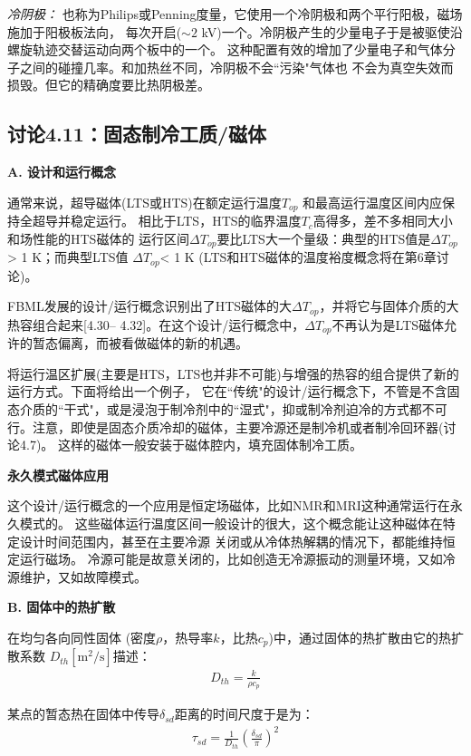 \textit{冷阴极：} 也称为Philips或Penning度量，它使用一个冷阴极和两个平行阳极，磁场施加于阳极板法向，
每次开启($\sim 2$ kV)一个。冷阴极产生的少量电子于是被驱使沿螺旋轨迹交替运动向两个板中的一个。
这种配置有效的增加了少量电子和气体分子之间的碰撞几率。和加热丝不同，冷阴极不会``污染"气体也
不会为真空失效而损毁。但它的精确度要比热阴极差。

\subsection{讨论4.11：固态制冷工质/磁体}
\textbf{A. 设计和运行概念}

通常来说，超导磁体(LTS或HTS)在额定运行温度$T_{op}$ 和最高运行温度区间内应保持全超导并稳定运行。
相比于LTS，HTS的临界温度$T_c$高得多，差不多相同大小和场性能的HTS磁体的
运行区间$\Delta T_{op}$要比LTS大一个量级：典型的HTS值是$\Delta T_{op}$ > 1 K；而典型LTS值
$\Delta T_{op}$< 1 K (LTS和HTS磁体的温度裕度概念将在第6章讨论)。

FBML发展的设计/运行概念识别出了HTS磁体的大$\Delta T_{op}$，并将它与固体介质的大热容组合起来[4.30–
4.32]。在这个设计/运行概念中，$\Delta T_{op}$不再认为是LTS磁体允许的暂态偏离，而被看做磁体的新的机遇。

将运行温区扩展(主要是HTS，LTS也并非不可能)与增强的热容的组合提供了新的运行方式。下面将给出一个例子，
它在``传统"的设计/运行概念下，不管是不含固态介质的``干式"，或是浸泡于制冷剂中的``湿式"，抑或制冷剂迫冷的方式都不可行。注意，即使是固态介质冷却的磁体，主要冷源还是制冷机或者制冷回环器(讨论4.7)。
这样的磁体一般安装于磁体腔内，填充固体制冷工质。

\textbf{永久模式磁体应用}

这个设计/运行概念的一个应用是恒定场磁体，比如NMR和MRI这种通常运行在永久模式的。
这些磁体运行温度区间一般设计的很大，这个概念能让这种磁体在特定设计时间范围内，甚至在主要冷源
关闭或从冷体热解耦的情况下，都能维持恒定运行磁场。
冷源可能是故意关闭的，比如创造无冷源振动的测量环境，又如冷源维护，又如故障模式。

\textbf{B. 固体中的热扩散}

在均匀各向同性固体 (密度$\rho$，热导率$k$，比热$c_p$)中，通过固体的热扩散由它的热扩散系数 $D_{th}[\mathrm{m^2/s}]$描述：
\begin{align}%
D_{th}=\frac{k}{\rho c_p}
\end{align}

某点的暂态热在固体中传导$\delta_{sd}$距离的时间尺度于是为：
\begin{align}%
\tau_{sd}=\frac{1}{D_{th}}\left(\frac{\delta_{sd}}{\pi}\right)^2
\end{align}

